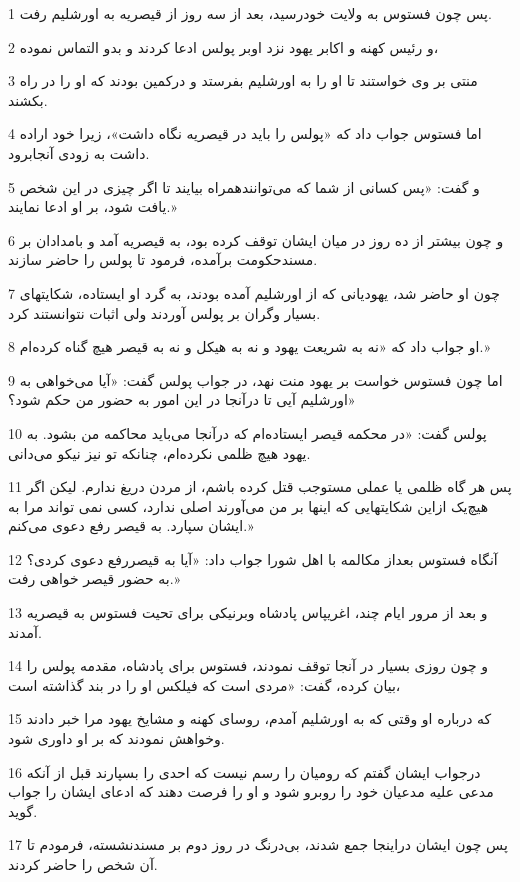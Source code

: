 \par 1 پس چون فستوس به ولایت خودرسید، بعد از سه روز از قیصریه به اورشلیم رفت.
\par 2 و رئیس کهنه و اکابر یهود نزد اوبر پولس ادعا کردند و بدو التماس نموده،
\par 3 منتی بر وی خواستند تا او را به اورشلیم بفرستد و درکمین بودند که او را در راه بکشند.
\par 4 اما فستوس جواب داد که «پولس را باید در قیصریه نگاه داشت»، زیرا خود اراده داشت به زودی آنجابرود.
\par 5 و گفت: «پس کسانی از شما که می‌توانندهمراه بیایند تا اگر چیزی در این شخص یافت شود، بر او ادعا نمایند.»
\par 6 و چون بیشتر از ده روز در میان ایشان توقف کرده بود، به قیصریه آمد و بامدادان بر مسندحکومت برآمده، فرمود تا پولس را حاضر سازند.
\par 7 چون او حاضر شد، یهودیانی که از اورشلیم آمده بودند، به گرد او ایستاده، شکایتهای بسیار وگران بر پولس آوردند ولی اثبات نتوانستند کرد.
\par 8 او جواب داد که «نه به شریعت یهود و نه به هیکل و نه به قیصر هیچ گناه کرده‌ام.»
\par 9 اما چون فستوس خواست بر یهود منت نهد، در جواب پولس گفت: «آیا می‌خواهی به اورشلیم آیی تا درآنجا در این امور به حضور من حکم شود؟»
\par 10 پولس گفت: «در محکمه قیصر ایستاده‌ام که درآنجا می‌باید محاکمه من بشود. به یهود هیچ ظلمی نکرده‌ام، چنانکه تو نیز نیکو می‌دانی.
\par 11 پس هر گاه ظلمی یا عملی مستوجب قتل کرده باشم، از مردن دریغ ندارم. لیکن اگر هیچ‌یک ازاین شکایتهایی که اینها بر من می‌آورند اصلی ندارد، کسی نمی تواند مرا به ایشان سپارد. به قیصر رفع دعوی می‌کنم.»
\par 12 آنگاه فستوس بعداز مکالمه با اهل شورا جواب داد: «آیا به قیصررفع دعوی کردی؟ به حضور قیصر خواهی رفت.»
\par 13 و بعد از مرور ایام چند، اغریپاس پادشاه وبرنیکی برای تحیت فستوس به قیصریه آمدند.
\par 14 و چون روزی بسیار در آنجا توقف نمودند، فستوس برای پادشاه، مقدمه پولس را بیان کرده، گفت: «مردی است که فیلکس او را در بند گذاشته است،
\par 15 که درباره او وقتی که به اورشلیم آمدم، روسای کهنه و مشایخ یهود مرا خبر دادند وخواهش نمودند که بر او داوری شود.
\par 16 درجواب ایشان گفتم که رومیان را رسم نیست که احدی را بسپارند قبل از آنکه مدعی علیه مدعیان خود را روبرو شود و او را فرصت دهند که ادعای ایشان را جواب گوید.
\par 17 پس چون ایشان دراینجا جمع شدند، بی‌درنگ در روز دوم بر مسندنشسته، فرمودم تا آن شخص را حاضر کردند.
